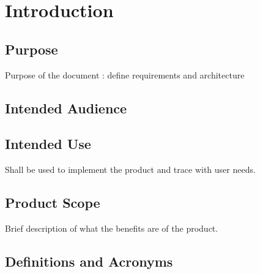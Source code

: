 \section{Introduction}
\subsection{Purpose}

Purpose of the document : define requirements and architecture

\subsection{Intended Audience}

\subsection{Intended Use}

Shall be used to implement the product and trace with user needs.

\subsection{Product Scope}

Brief description of what the benefits are of the product.

\subsection{Definitions and Acronyms}

\newpage

